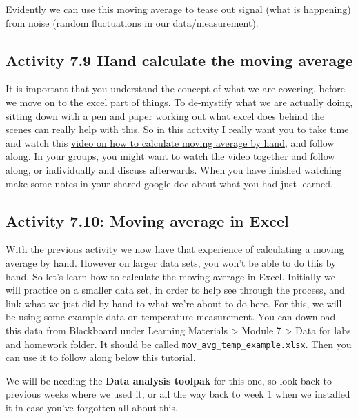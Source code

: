 \documentclass[
]{book}
\begin{document}
Evidently we can use this moving average to tease out signal (what is happening) from noise (random fluctuations in our data/measurement).

\hypertarget{activity-7.9-hand-calculate-the-moving-average}{%
\subsection{Activity 7.9 Hand calculate the moving average}\label{activity-7.9-hand-calculate-the-moving-average}}

It is important that you understand the concept of what we are covering, before we move on to the excel part of things. To de-mystify what we are actually doing, sitting down with a pen and paper working out what excel does behind the scenes can really help with this. So in this activity I really want you to take time and watch this \href{https://www.youtube.com/watch?v=vvbvVJiJ2fI}{video on how to calculate moving average by hand}, and follow along. In your groups, you might want to watch the video together and follow along, or individually and discuss afterwards. When you have finished watching make some notes in your shared google doc about what you had just learned.

\hypertarget{activity-7.10-moving-average-in-excel}{%
\subsection{Activity 7.10: Moving average in Excel}\label{activity-7.10-moving-average-in-excel}}

With the previous activity we now have that experience of calculating a moving average by hand. However on larger data sets, you won't be able to do this by hand. So let's learn how to calculate the moving average in Excel. Initially we will practice on a smaller data set, in order to help see through the process, and link what we just did by hand to what we're about to do here. For this, we will be using some example data on temperature measurement. You can download this data from Blackboard under Learning Materials \textgreater{} Module 7 \textgreater{} Data for labs and homework folder. It should be called \texttt{mov\_avg\_temp\_example.xlsx}. Then you can use it to follow along below this tutorial.

We will be needing the \textbf{Data analysis toolpak} for this one, so look back to previous weeks where we used it, or all the way back to week 1 when we installed it in case you've forgotten all about this.
\end{document}
